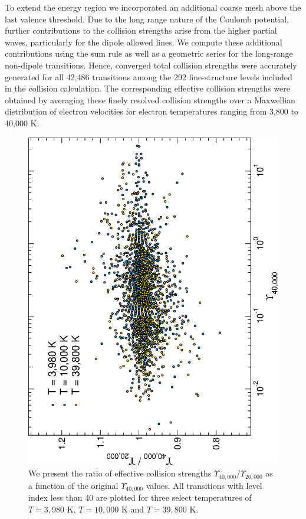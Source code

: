  To extend the energy region we incorporated an additional coarse mesh above the last valence threshold. Due to the long range nature of the Coulomb potential, further contributions to the collision strengths arise from the higher partial waves, particularly for the dipole allowed lines. We compute these additional contributions using the \citet{1992A&A...254..436B} sum rule as well as a geometric series for the long-range non-dipole transitions. Hence, converged total collision strengths were accurately generated for all 42,486 transitions among the 292 fine-structure levels included in the collision calculation. The corresponding effective collision strengths were obtained by averaging these finely resolved collision strengths over a Maxwellian distribution of electron velocities for electron temperatures ranging from 3,800 to 40,000 K.  

%
\begin{figure}[hbt]
\includegraphics[scale=0.52, angle=-90]{Figures/Cobalt/mesh/adf_compare.eps}
\caption{We present the ratio of effective collision strengths $\Upsilon_{40,000}/\Upsilon_{20,000}$ as a function of the original $\Upsilon_{40,000}$ values. All transitions with level index less than 40 are plotted for three select temperatures of $T=3,980$ K, $T=10,000$ K and $T=39,800$ K. \label{fig:co_adfcomp}}
\end{figure}
%

